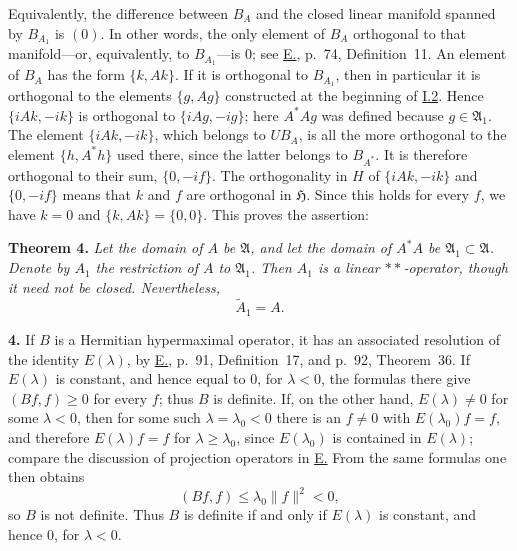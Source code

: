\documentclass[fontsize=13pt,paper=b5,leqno,bookmarkpackage=false]{scrartcl}
\begin{document}
Equivalently, the difference between \(B_A\) and the closed linear
manifold spanned by \(B_{A_1}\) is \((0)\).  In other words, the only
element of \(B_A\) orthogonal to that manifold---or, equivalently, to
\(B_{A_1}\)---is \(0\); see \hyperlink{bib:E}{E.}, p.~74,
Definition~11.  An element of \(B_A\) has the form \(\{k,Ak\}\).  If it is
orthogonal to \(B_{A_1}\), then in particular it is orthogonal to the
elements \(\{g,Ag\}\) constructed at the beginning of
\hyperref[subsec:I.2]{I.2}.  Hence \(\{iAk,-ik\}\) is orthogonal to
\(\{iAg,-ig\}\); here \(A^*Ag\) was defined because
\(g\in\mathfrak A_1\).  The element \(\{iAk,-ik\}\), which belongs to
\(UB_A\), is all the more orthogonal to the element \(\{h,A^*h\}\) used
there, since the latter belongs to \(B_{A^*}\).  It is therefore
orthogonal to their sum, \(\{0,-if\}\).  The orthogonality in \(H\) of
\(\{iAk,-ik\}\) and \(\{0,-if\}\) means that \(k\) and \(f\) are
orthogonal in \(\mathfrak H\).  Since this holds for every \(f\), we have
\(k=0\) and \(\{k,Ak\}=\{0,0\}\).  This proves the assertion:

\begin{samepage}
\par\smallskip
{}
\label{thm:4}
\noindent\textbf{Theorem 4.}
\textit{Let the domain of \(A\) be \(\mathfrak A\), and let the domain of
\(A^*A\) be \(\mathfrak A_1\subset\mathfrak A\).  Denote by \(A_1\) the
restriction of \(A\) to \(\mathfrak A_1\).  Then \(A_1\) is a linear
\(**\)-operator, though it need not be closed.  Nevertheless,}
\[
  \widetilde A_1=A.
\]
\end{samepage}

\par\smallskip
{}
\label{subsec:I.4}
\noindent\textbf{4.}
If \(B\) is a Hermitian hypermaximal operator, it has an associated
resolution of the identity \(E(\lambda)\), by \hyperlink{bib:E}{E.},
p.~91, Definition~17, and p.~92, Theorem~36.  If \(E(\lambda)\) is
constant, and hence equal to \(0\), for \(\lambda<0\), the formulas there
give \((Bf,f)\ge0\) for every \(f\); thus \(B\) is definite.  If, on the
other hand, \(E(\lambda)\ne0\) for some \(\lambda<0\), then for some such
\(\lambda=\lambda_0<0\) there is an \(f\ne0\) with
\(E(\lambda_0)f=f\),
and therefore \(E(\lambda)f=f\) for \(\lambda\ge\lambda_0\), since
\(E(\lambda_0)\) is contained in \(E(\lambda)\); compare the discussion
of projection operators in \hyperlink{bib:E}{E.}  From the same formulas
one then obtains
\[
  (Bf,f)\le\lambda_0\lVert f\rVert^2<0,
\]
so \(B\) is not definite.  Thus \(B\) is definite if and only if
\(E(\lambda)\) is constant, and hence \(0\), for \(\lambda<0\).
\end{document}

